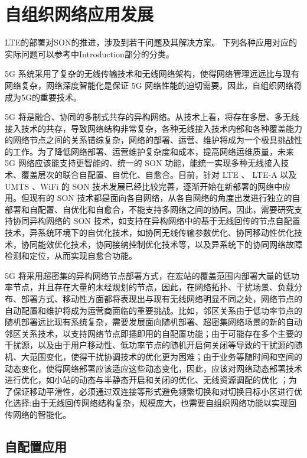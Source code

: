 \documentclass{IEEEtran}
\begin{document}
\section{自组织网络应用发展}
\label{sec:SON}
LTE的部署对SON的推进，涉及到若干问题及其解决方案。
下列各种应用对应的实际问题可以参考\cite{Klaine2017}中Introduction部分的分类。

5G 系统采用了复杂的无线传输技术和无线网络架构，使得网络管理远远比与现有网络复杂，网络深度智能化是保证 5G 网络性能的迫切需要。因此，自组织网络将成为5G的重要技术。

5G 将是融合、协同的多制式共存的异构网络。从技术上看，将存在多层、多无线接入技术的共存，导致网络结构非常复杂，各种无线接入技术内部和各种覆盖能力的网络节点之间的关系错综复杂，网络的部署、运营、维护将成为一个极具挑战性的工作。为了降低网络部署、运营维护复杂度和成本，提高网络运维质量，未来 5G 网络应该能支持更智能的、统一的 SON 功能，能统一实现多种无线接入技术、覆盖层次的联合自配置、自优化、自愈合。目前，针对 LTE 、 LTE-A 以及 UMTS 、WiFi 的 SON 技术发展已经比较完善，逐渐开始在新部署的网络中应用。但现有的 SON 技术都是面向各自网络，从各自网络的角度出发进行独立的自部署和自配置、自优化和自愈合，不能支持多网络之间的协同。因此，需要研究支持协同异构网络的 SON 技术，如支持在异构网络中的基于无线回传的节点自配置技术，异系统环境下的自优化技术，如协同无线传输参数优化、协同移动性优化技术，协同能效优化技术，协同接纳控制优化技术等，以及异系统下的协同网络故障检测和定位，从而实现自愈合功能。

5G 将采用超密集的异构网络节点部署方式，在宏站的覆盖范围内部署大量的低功率节点，并且存在大量的未经规划的节点，因此，在网络拓扑、干扰场景、负载分布、部署方式、移动性方面都将表现出与现有无线网络明显不同之处，网络节点的自动配置和维护将成为运营商面临的重要挑战。比如，邻区关系由于低功率节点的随机部署远比现有系统复杂，需要发展面向随机部署、超密集网络场景的新的自动邻区关系技术，以支持网络节点即插即用的自配置功能；由于可能存在多个主要的干扰源，以及由于用户移动性、低功率节点的随机开启何关闭等导致的干扰源的随机、大范围变化，使得干扰协调技术的优化更为困难；由于业务等随时间和空间的动态变化，使得网络部署应该适应这些动态变化，因此，应该对网络动态部署技术进行优化，如小站的动态与半静态开启和关闭的优化、无线资源调配的优化 ；为了保证移动平滑性，必须通过双连接等形式避免频繁切换和对切换目标小区进行优化选择;由于无线回传网络结构复杂，规模庞大，也需要自组织网络功能以实现回传网络的智能化。


\subsection{自配置应用}
\label{sec:self-configuration}
\end{document}
